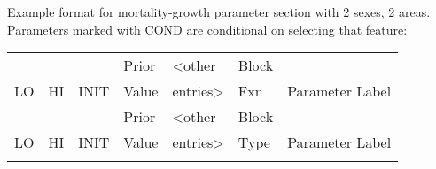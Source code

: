Example format for mortality-growth parameter section with 2 sexes, 2 areas.
Parameters marked with COND are conditional on selecting that feature:
\begin{longtable}{p{1.1cm} p{1.1cm} p{1.1cm}  p{1.1cm}  p{1.5cm}  p{1.1cm}  p{6.75cm}  }
	\hline
	   &    &      & Prior &  <other  & Block &  \Tstrut\\
	LO & HI & INIT & Value &  entries>& Fxn & Parameter Label \Bstrut\\
	\hline
	\endfirsthead

	\hline
	   &    &      & Prior &  <other   & Block &  \Tstrut\\
	LO & HI & INIT & Value &  entries> & Type & Parameter Label \Bstrut\\
	\hline
	\endhead

	\hline
	\endfoot

	\endlastfoot


\end{longtable}
